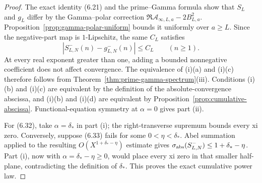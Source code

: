 \documentclass[11pt]{article}
\begin{document}
\begin{proof}
The exact identity \textup{(6.21)} and the prime--Gamma formula show that $S_L$ and $g_L$ differ
by the Gamma--polar correction
$\Re\mathcal A_{\infty,L,a}-2B_{L,a}^2$.
Proposition~\ref{prop:gamma-polar-uniform} bounds it uniformly over $a\ge L$.  Since the
negative-part map is $1$-Lipschitz, the same $C_L$ satisfies
\[
 |S_{L,N}^-(n)-g_{L,N}^-(n)|\le C_L
 \qquad(n\ge1).
 \tag{6.34}
\]
At every real exponent greater than one, adding a bounded nonnegative coefficient does not
affect convergence.  The equivalence of (i)(a) and (i)(c) therefore follows from
Theorem~\ref{thm:prime-gamma-spectrum}\textup{(iii)}.  Conditions (i)(b) and (i)(c) are
equivalent by the definition of the absolute-convergence abscissa, and (i)(b) and (i)(d) are
equivalent by Proposition~\ref{prop:cumulative-abscissa}.  Functional-equation symmetry at
$\alpha=0$ gives part (ii).

For \textup{(6.32)}, take $\alpha=\delta_*$ in part (i); the right-transverse supremum bounds
every xi zero.  Conversely, suppose \textup{(6.33)} fails for some
$0<\eta<\delta_*$.  Abel summation applied to the resulting
$O(X^{1+\delta_*-\eta})$ estimate gives
$\sigma_{\rm abs}(S_{L,N}^-)\le1+\delta_*-\eta$.  Part (i), now with
$\alpha=\delta_*-\eta\ge0$, would place every xi zero in that smaller half-plane, contradicting
the definition of $\delta_*$.  This proves the exact cumulative power law.
\end{proof}
\end{document}

